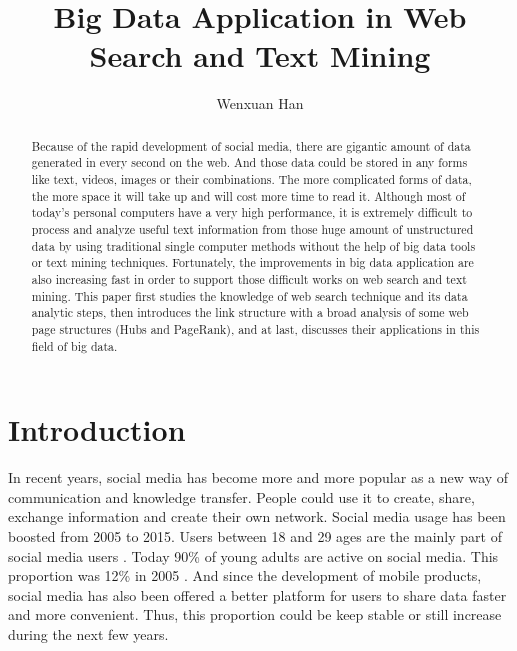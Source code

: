 \documentclass[sigconf]{acmart}
\begin{document}
\title{Big Data Application in Web Search and Text Mining}


\author{Wenxuan Han}



\begin{abstract}
Because of the rapid development of social media, there are gigantic amount of data generated in every second on the web. And those data could be stored in any forms like text, videos, images or their combinations. The more complicated forms of data, the more space it will take up and will cost more time to read it. Although most of today's personal computers have a very high performance, it is extremely difficult to process and analyze useful text information from those huge amount of unstructured data by using traditional single computer methods without the help of big data tools or text mining techniques. Fortunately, the improvements in big data application are also increasing fast in order to support those difficult works on web search and text mining. This paper first studies the knowledge of web search technique and its data analytic steps, then introduces the link structure with a broad analysis of some web page structures (Hubs and PageRank), and at last, discusses their applications in this field of big data.
\end{abstract}



\maketitle

\section{Introduction}

In recent years, social media has become more and more popular as a new way of communication and knowledge transfer. People could use it to create, share, exchange information and create their own network. Social media usage has been boosted from 2005 to 2015. Users between 18 and 29 ages are the mainly part of social media users \cite{editor01}. Today 90\% of young adults are active on social media. This proportion was 12\% in 2005 \cite{editor02}. And since the development of mobile products, social media has also been offered a better platform for users to share data faster and more convenient. Thus, this proportion could be keep stable or still increase during the next few years.
\end{document}
